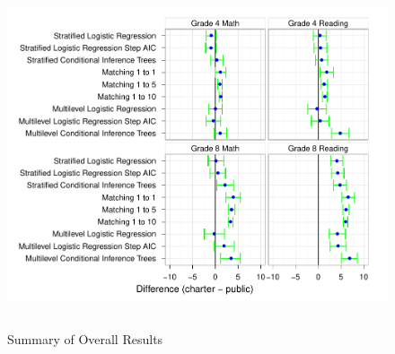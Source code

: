 \documentclass[letterpaper,12pt]{article}
\begin{document}
\begin{figure}[t]
\begin{center}
\includegraphics[height=4in]{../Figures/overallsummary.pdf}
\caption{Summary of Overall Results}
\label{fig:overallresults}
\end{center}
\end{figure}



\cleardoublepage



\newpage

\cleardoublepage
{}
\appendix

\renewcommand{\thefootnote}{\fnsymbol{footnote}}%
\end{document}
